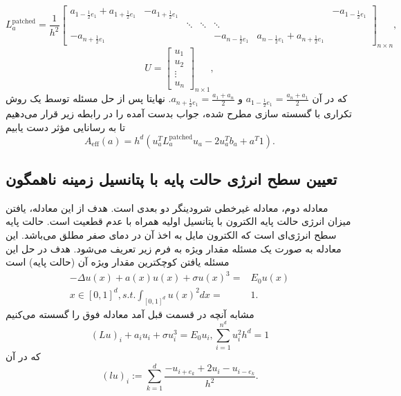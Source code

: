 \begin{equation*}
	L_{a}^{\text{patched}} = \frac{1}{h^2}\begin{bmatrix}
		a_{1 - \frac{1}{2}e_{1}} + a_{1 + \frac{1}{2}e_{1}}  &  -a_{1+\frac{1}{2}e_{1}} &  &  & & &-a_{1-\frac{1}{2}e_{1}}\\
		&& \ddots& \ddots &\ddots  &&  \\
		-a_{n+\frac{1}{2}e_{1}}&& & & -a_{n-\frac{1}{2}e_{1}} &a_{n-\frac{1}{2}e_{1}} + a_{n+\frac{1}{2}e_{1}}
	\end{bmatrix}_{n \times n},
\end{equation*}
\begin{equation*}
	U = \begin{bmatrix}
		u_{1} \\
		u_{2} \\
		\vdots \\
		u_{n}
	\end{bmatrix}_{n \times 1},
\end{equation*}
که در آن $a_{1-\frac{1}{2}e_{1}} = \frac{a_{n} + a_{1}}{2}$ و $a_{n+\frac{1}{2}e_{1}} = \frac{a_{1} + a_{n}}{2}$. نهایتا پس از حل مسئله توسط یک روش تکراری با گسسته سازی مطرح شده، جواب بدست آمده را در رابطه زیر قرار می‌دهیم تا به رسانایی مؤثر دست یابیم
\begin{equation}
	A_{\text{eff}}(a) = h^d (u_{a}^{T} L_{a}^{\text{patched}} u_{a} - 2u_{a}^{T}b_a + a^T 1).
\end{equation} 
\subsection*{تعیین سطح انرژی حالت پایه با پتانسیل زمینه ناهمگون}
معادله دوم، معادله غیرخطی شرودینگر دو بعدی است. هدف از این معادله، یافتن میزان انرژی حالت پایه الکترون با پتانسیل اولیه همراه با عدم قطعیت است. حالت پایه سطح انرژی‌ای است که الکترون مایل به اخذ آن در دمای صفر مطلق می‌باشد. این معادله به صورت یک مسئله مقدار ویژه به فرم زیر تعریف می‌شود. هدف در حل این مسئله یافتن کوچکترین مقدار ویژه آن (حالت پایه) است
\begin{align*}
-\Delta u(x) + a(x)u(x) + \sigma u(x)^3 =& E_0 u(x)\\ x\in [0,1]^d, s.t. \int_{[0,1]^d}u(x)^2 dx =& 1.
\end{align*}
مشابه آنچه در قسمت قبل آمد معادله فوق را گسسته می‌کنیم
\begin{equation}
	(Lu)_i + a_i u_i + \sigma u_{i}^3 = E_0 u_i, \sum_{i=1}^{n^d} u_{i}^2 h^d = 1
\end{equation}
که در آن
\begin{equation*}
	(lu)_i := \sum_{k=1}^{d} \frac{-u_{i+e_{k}} + 2u_i - u_{i-e_{k}}}{h^2}.
\end{equation*}
